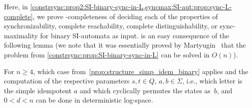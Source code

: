 
Here, in \cref{constrsync:prop2:SI-binary-sync-in-L,syncmax:SI-aut:prop:sync-L-complete}, 
we prove \LOGSPACE-completeness of deciding each of the properties 
of synchronizability, complete reachability, 
complete distinguishability, or sync-maximality
for binary SI-automata as input. 
is an easy consequence of the following lemma (we note that it was essentially
proved by Martyugin~\cite[Prop.~6.2]{Mar2009b}
that the problem from \cref{constrsync:prop:SI-binary-sync-in-L} 
can be solved in $O(n)$).

\begin{lemma}
	\label{constrsync:prop:SI-binary-sync-in-L}
	For $n \ge 4$, which case  from~\cref{prop:structure_simp_idem_binary} 
	applies and the computation of the respective parameters $s,t \in Q$, $a,b \in \Sigma$, 
	i.e., which letter is the simple idempotent $a$ and which cyclically permutes the states as~$b$,
	and $0 < d < n$ can be done in deterministic log-space.
\end{lemma}
